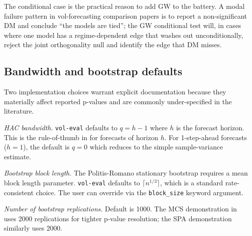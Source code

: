 The conditional case is the practical reason to add GW to the battery. A modal failure pattern in vol-forecasting comparison papers is to report a non-significant DM and conclude ``the models are tied''; the GW conditional test will, in cases where one model has a regime-dependent edge that washes out unconditionally, reject the joint orthogonality null and identify the edge that DM misses.

\subsection{Bandwidth and bootstrap defaults}

Two implementation choices warrant explicit documentation because they materially affect reported p-values and are commonly under-specified in the literature.

\textit{HAC bandwidth.} \texttt{vol-eval} defaults to $q = h - 1$ where $h$ is the forecast horizon. This is the rule-of-thumb in \citet{DieboldMariano1995} for forecasts of horizon $h$. For 1-step-ahead forecasts ($h = 1$), the default is $q = 0$ which reduces to the simple sample-variance estimate.

\textit{Bootstrap block length.} The Politis-Romano stationary bootstrap requires a mean block length parameter. \texttt{vol-eval} defaults to $\lceil n^{1/3}\rceil$, which is a standard rate-consistent choice. The user can override via the \texttt{block\_size} keyword argument.

\textit{Number of bootstrap replications.} Default is 1000. The MCS demonstration in  uses 2000 replications for tighter p-value resolution; the SPA demonstration similarly uses 2000.
